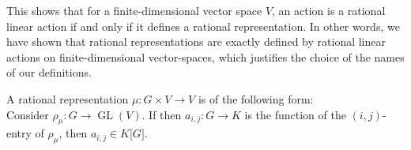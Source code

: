 
\begin{remark}
  This shows that for a finite-dimensional vector space $V$, an action is a rational linear action if and only if it defines a rational representation.
  In other words, we have shown that rational representations are exactly defined by rational linear actions on finite-dimensional vector-spaces, which justifies the choice of the names of our definitions.
\end{remark}

\begin{remark}
  A rational representation $\mu \colon G \times V \rightarrow V$ is of the following form:\\
  Consider $\rho_{\mu} \colon G \rightarrow \operatorname{GL}(V)$.
  If then $ a_{i,j} : G \rightarrow K $ is the function of the $\left( i,j \right) $-entry of $\rho_{\mu}$, then $ a_{i,j} \in K\lbrack G\rbrack $.\\
\end{remark}

